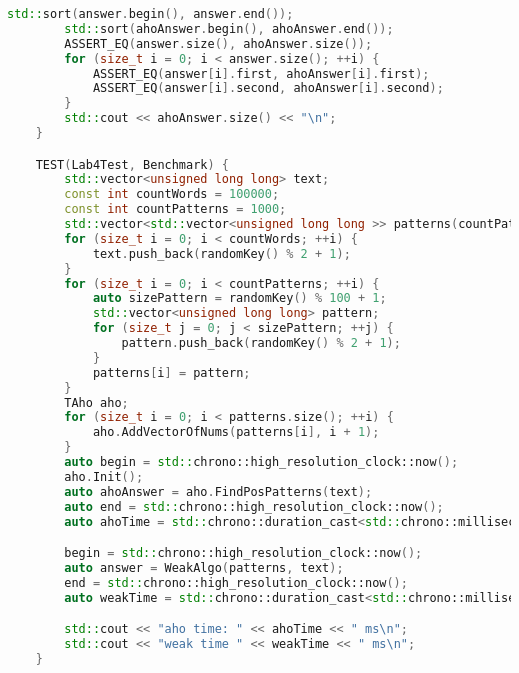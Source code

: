 \begin{lstlisting}[language=C++]
        std::sort(answer.begin(), answer.end());
        std::sort(ahoAnswer.begin(), ahoAnswer.end());
        ASSERT_EQ(answer.size(), ahoAnswer.size());
        for (size_t i = 0; i < answer.size(); ++i) {
            ASSERT_EQ(answer[i].first, ahoAnswer[i].first);
            ASSERT_EQ(answer[i].second, ahoAnswer[i].second);
        }
        std::cout << ahoAnswer.size() << "\n";
    }

    TEST(Lab4Test, Benchmark) {
        std::vector<unsigned long long> text;
        const int countWords = 100000;
        const int countPatterns = 1000;
        std::vector<std::vector<unsigned long long >> patterns(countPatterns);
        for (size_t i = 0; i < countWords; ++i) {
            text.push_back(randomKey() % 2 + 1);
        }
        for (size_t i = 0; i < countPatterns; ++i) {
            auto sizePattern = randomKey() % 100 + 1;
            std::vector<unsigned long long> pattern;
            for (size_t j = 0; j < sizePattern; ++j) {
                pattern.push_back(randomKey() % 2 + 1);
            }
            patterns[i] = pattern;
        }
        TAho aho;
        for (size_t i = 0; i < patterns.size(); ++i) {
            aho.AddVectorOfNums(patterns[i], i + 1);
        }
        auto begin = std::chrono::high_resolution_clock::now();
        aho.Init();
        auto ahoAnswer = aho.FindPosPatterns(text);
        auto end = std::chrono::high_resolution_clock::now();
        auto ahoTime = std::chrono::duration_cast<std::chrono::milliseconds>(end - begin).count();

        begin = std::chrono::high_resolution_clock::now();
        auto answer = WeakAlgo(patterns, text);
        end = std::chrono::high_resolution_clock::now();
        auto weakTime = std::chrono::duration_cast<std::chrono::milliseconds>(end - begin).count();

        std::cout << "aho time: " << ahoTime << " ms\n";
        std::cout << "weak time " << weakTime << " ms\n";
    }
\end{lstlisting}


